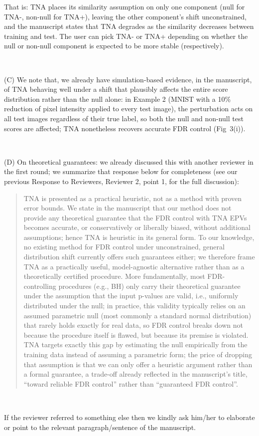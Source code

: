 \documentclass{article}
\begin{document}
{That is: TNA places its similarity assumption on only one component (null for TNA-, non-null for TNA+), leaving the other component's shift unconstrained, and the manuscript states that TNA degrades as the similarity decreases between training and test. The user can pick TNA- or TNA+ depending on whether the null or non-null component is expected to be more stable (respectively).

\ 

(C) We note that, we already have simulation-based evidence, in the manuscript, of TNA behaving well under a shift that plausibly affects the entire score distribution rather than the null alone: in Example 2 (MNIST with a 10\% reduction of pixel intensity applied to every test image), the perturbation acts on all test images regardless of their true label, so both the null and non-null test scores are affected; TNA nonetheless recovers accurate FDR control (Fig~3(i)).

\

(D) On theoretical guarantees: we already discussed this with another reviewer in the first round; we summarize that response below for completeness (see our previous Response to Reviewers, Reviewer 2, point 1, for the full discussion):
\begin{quotation}\noindent
TNA is presented as a practical heuristic, not as a method with proven error bounds. We state in the manuscript that our method does not provide any theoretical guarantee that the FDR control with TNA EPVs becomes accurate, or conservatively or liberally biased, without additional assumptions; hence TNA is heuristic in its general form. To our knowledge, no existing method for FDR control under unconstrained, general distribution shift currently offers such guarantees either; we therefore frame TNA as a practically useful, model-agnostic alternative rather than as a theoretically certified procedure. More fundamentally, most FDR-controlling procedures (e.g., BH) only carry their theoretical guarantee under the assumption that the input p-values are valid, i.e., uniformly distributed under the null; in practice, this validity typically relies on an assumed parametric null (most commonly a standard normal distribution) that rarely holds exactly for real data, so FDR control breaks down not because the procedure itself is flawed, but because its premise is violated. TNA targets exactly this gap by estimating the null empirically from the training data instead of assuming a parametric form; the price of dropping that assumption is that we can only offer a heuristic argument rather than a formal guarantee, a trade-off already reflected in the manuscript's title, ``toward reliable FDR control'' rather than ``guaranteed FDR control''.
\end{quotation}

\

If the reviewer referred to something else then we kindly ask him/her to elaborate or point to the relevant paragraph/sentence of the manuscript.
}
\end{document}
